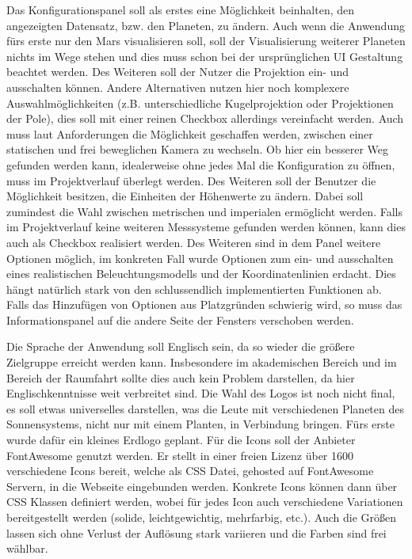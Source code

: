 Das Konfigurationspanel soll als erstes eine Möglichkeit beinhalten, den angezeigten Datensatz, bzw. den Planeten, zu ändern. Auch wenn die Anwendung fürs erste nur den Mars visualisieren soll, soll der Visualisierung weiterer Planeten nichts im Wege stehen und dies muss schon bei der ursprünglichen UI Gestaltung beachtet werden. Des Weiteren soll der Nutzer die Projektion ein- und ausschalten können. Andere Alternativen nutzen hier noch komplexere Auswahlmöglichkeiten (z.B. unterschiedliche Kugelprojektion oder Projektionen der Pole), dies soll mit einer reinen Checkbox allerdings vereinfacht werden. Auch muss laut Anforderungen die Möglichkeit geschaffen werden, zwischen einer statischen und frei beweglichen Kamera zu wechseln. Ob hier ein besserer Weg gefunden werden kann, idealerweise ohne jedes Mal die Konfiguration zu öffnen, muss im Projektverlauf überlegt werden. Des Weiteren soll der Benutzer die Möglichkeit besitzen, die Einheiten der Höhenwerte zu ändern. Dabei soll zumindest die Wahl zwischen metrischen und imperialen ermöglicht werden. Falls im Projektverlauf keine weiteren Messsysteme gefunden werden können, kann dies auch als Checkbox realisiert werden. Des Weiteren sind in dem Panel weitere Optionen möglich, im konkreten Fall wurde Optionen zum ein- und ausschalten eines realistischen Beleuchtungsmodells und der Koordinatenlinien erdacht. Dies hängt natürlich stark von den schlussendlich implementierten Funktionen ab. Falls das Hinzufügen von Optionen aus Platzgründen schwierig wird, so muss das Informationspanel auf die andere Seite der Fensters verschoben werden.

Die Sprache der Anwendung soll Englisch sein, da so wieder die größere Zielgruppe erreicht werden kann. Insbesondere im akademischen Bereich und im Bereich der Raumfahrt sollte dies auch kein Problem darstellen, da hier Englischkenntnisse weit verbreitet sind. Die Wahl des Logos ist noch nicht final, es soll etwas universelles darstellen, was die Leute mit verschiedenen Planeten des Sonnensystems, nicht nur mit einem Planten, in Verbindung bringen. Fürs erste wurde dafür ein kleines Erdlogo geplant. Für die Icons soll der Anbieter FontAwesome genutzt werden. Er stellt in einer freien Lizenz über 1600 verschiedene Icons bereit, welche als CSS Datei, gehosted auf FontAwesome Servern, in die Webseite eingebunden werden. Konkrete Icons können dann über CSS Klassen definiert werden, wobei für jedes Icon auch verschiedene Variationen bereitgestellt werden (solide, leichtgewichtig, mehrfarbig, etc.). Auch die Größen lassen sich ohne Verlust der Auflösung stark variieren und die Farben sind frei wählbar.